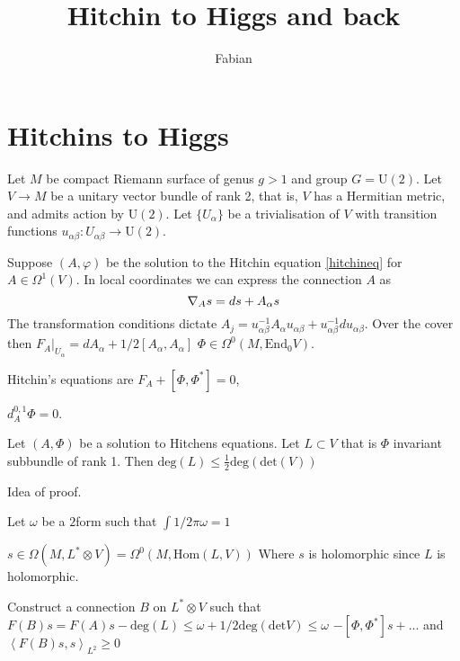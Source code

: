 % 


\title{Hitchin to Higgs and back}
\author{Fabian}
\date{}

 
\maketitle
\Large

\section{Hitchins to Higgs} %

Let $M$ be compact Riemann surface of genus $g > 1$ and group $ G  = \mathrm{U}(2) $.
Let $ V \rightarrow M $ be a unitary vector bundle of rank 2, that is, $V$ has a Hermitian metric, and admits action by $\mathrm{U}(2)$.
Let $\{U_{\alpha} \} $ be a trivialisation of $V$ with transition functions 
$ u_{\alpha \beta} : U_{\alpha \beta} \rightarrow  \mathrm{U}(2) $. 

Suppose $ (A, \varphi) $ be the solution to the Hitchin equation \ref{hitchineq} for $A \in \Omega^1(V)$.
In local coordinates we can express the connection $A$ as 
\begin{equation}
    \nabla _{ A} s = ds + A_{\alpha} s \\
\end{equation}
The transformation conditions dictate $ A_j = u_{\alpha \beta} ^{-1} A_{\alpha} u_{\alpha \beta}  +  u_{\alpha \beta} ^{-1} d u_{\alpha \beta}$. 
Over the cover then $ F_A |_{U_{\alpha} }  = d A_{\alpha} + 1/2 [A_{\alpha} , A_{\alpha}] $
$ \Phi \in \Omega ^0 (M , \mathrm{End}_0 V) $.


Hitchin's equations are
$F_A + [ \Phi , \Phi^* ] =0 $,

$d_A ^{0,1} \Phi = 0 $. 

\begin{theorem}
    Let $( A,  \Phi ) $ be a solution to Hitchens equations. 
    Let $ L \subset V $ that is $ \Phi $ invariant subbundle of rank 1. 
    Then $ \mathrm{deg} (L ) \leq \frac{1}{2} \mathrm{deg} ( \mathrm{det} ( V) ) $ 
\end{theorem}

Idea of proof. 

Let $\omega $ be a $2$form such that 
$ \int 1/2 \pi \omega  = 1$ 

$ s \in \Omega( M, L^* \otimes V ) = \Omega ^0 ( M , \mathrm{Hom}(L, V) ) $ 
Where $s$ is holomorphic since $L$ is holomorphic. 

Construct a connection $B$ on $L^* \otimes V$ such that 
$F(B) s = F(A) s - \mathrm{deg} ( L) \leq \omega + 1/2 \mathrm{deg}( \mathrm{det} V ) \leq \omega $ 
$ - [\Phi , \Phi ^* ] s + ... $ 
and 
$ \left< F(B) s, s \right> _{L^2} \geq 0 $ 

